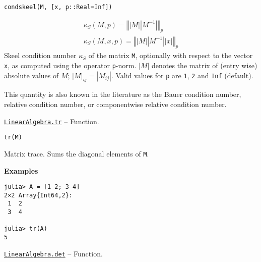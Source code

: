 \begin{adjustwidth}{2em}{0pt}


\begin{verbatim}
condskeel(M, [x, p::Real=Inf])
\end{verbatim}

\begin{equation*}
\begin{split}\kappa_S(M, p) = \left\Vert \left\vert M \right\vert \left\vert M^{-1} \right\vert \right\Vert_p \\
\kappa_S(M, x, p) = \left\Vert \left\vert M \right\vert \left\vert M^{-1} \right\vert \left\vert x \right\vert \right\Vert_p\end{split}\end{equation*}
Skeel condition number \(\kappa_S\) of the matrix \texttt{M}, optionally with respect to the vector \texttt{x}, as computed using the operator \texttt{p}-norm. \(\left\vert M \right\vert\) denotes the matrix of (entry wise) absolute values of \(M\); \(\left\vert M \right\vert_{ij} = \left\vert M_{ij} \right\vert\). Valid values for \texttt{p} are \texttt{1}, \texttt{2} and \texttt{Inf} (default).

This quantity is also known in the literature as the Bauer condition number, relative condition number, or componentwise relative condition number.



\end{adjustwidth}
\hypertarget{3355659645971312171}{} 
\hyperlink{3355659645971312171}{\texttt{LinearAlgebra.tr}}  -- {Function.}

\begin{adjustwidth}{2em}{0pt}


\begin{verbatim}
tr(M)
\end{verbatim}

Matrix trace. Sums the diagonal elements of \texttt{M}.

\textbf{Examples}


\begin{verbatim}
julia> A = [1 2; 3 4]
2×2 Array{Int64,2}:
 1  2
 3  4

julia> tr(A)
5
\end{verbatim}



\end{adjustwidth}
\hypertarget{16543378577000914469}{} 
\hyperlink{16543378577000914469}{\texttt{LinearAlgebra.det}}  -- {Function.}

